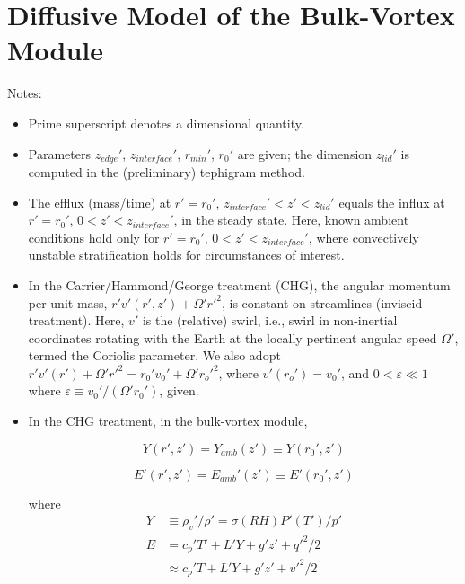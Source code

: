 \documentclass[preprint, prX]{revtex4}
\newcommand{\rmin}{r_{min}}
\newcommand{\zedge}{z_{edge}}
\newcommand{\zinter}{z_{interface}}
\begin{document}
\section{Diffusive Model of the Bulk-Vortex Module}

\begin{figure}[h!]
	\centering
	\def\svgwidth{0.7\columnwidth}
	
\end{figure}

Notes:
\begin{itemize}

\item Prime superscript denotes a dimensional quantity.
\item Parameters $\zedge'$, $\zinter'$, $\rmin'$, $r_0'$ are given; the dimension $z_{lid}'$ is computed in the (preliminary) tephigram method.
\item The efflux (mass/time) at $r' = r_0'$, $\zinter' < z' < z_{lid}'$ equals the influx at $r'=r_0'$, $0 < z' < \zinter'$, in the steady state. Here, known ambient conditions hold only for $r' = r_0'$, $0 < z' < \zinter'$, where convectively unstable stratification holds for circumstances of interest.

\item In the Carrier/Hammond/George treatment (CHG), the angular momentum per unit mass, $r' v'(r', z') + \Omega' r'^2$, is constant on streamlines (inviscid treatment). Here, $v'$ is the (relative) swirl, i.e., swirl in non-inertial coordinates rotating with the Earth at the locally pertinent angular speed $\Omega'$, termed the Coriolis parameter. We also adopt $r' v' (r') + \Omega' r'^2 = r_0' v_0' + \Omega' r_o'^2$, where $v'(r_o') = v_0'$, and $0 < \varepsilon \ll 1$ where $\varepsilon \equiv v_0' / (\Omega' r_0')$, given.

\item In the CHG treatment, in the bulk-vortex module,

\begin{equation}
	Y(r', z') = Y_{amb}(z') \equiv Y(r_0', z')
	\label{eq:bulky}
\end{equation}

\begin{equation}
	E'(r',z') = E_{amb}'(z') \equiv E'(r_0', z')
	\label{eq:bulke}
\end{equation}

where 
\begin{equation}
\begin{split}
	Y &\equiv \rho_v' / \rho' = \sigma(RH) P'(T')/ p' \\
	E &= c_p' T' + L' Y + g'z' + q'^2 /2 \\
	&\approx c_p' T + L'Y + g'z' + v'^2 / 2
\end{split}
\end{equation}


\end{itemize}
\end{document}
